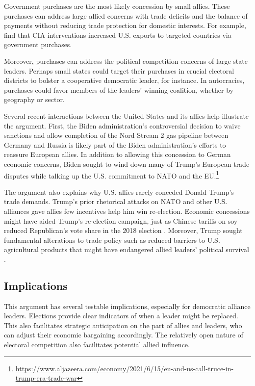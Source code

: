 \documentclass[12pt]{article}
\begin{document}
Government purchases are the most likely concession by small allies. 
These purchases can address large allied concerns with trade deficits and the balance of payments without reducing trade protection for domestic interests. 
For example, \citep{Bergeretal2013} find that CIA interventions increased U.S. exports to targeted countries via government purchases.


Moreover, purchases can address the political competition concerns of large state leaders.
Perhaps small states could target their purchases in crucial electoral districts to bolster a cooperative democratic leader, for instance. 
In autocracies, purchases could favor members of the leaders' winning coalition, whether by geography or sector.


Several recent interactions between the United States and its allies help illustrate the argument. 
First, the Biden administration's controversial decision to waive sanctions and allow completion of the Nord Stream 2 gas pipeline between Germany and Russia is likely part of the Biden administration's efforts to reassure European allies. 
In addition to allowing this concession to German economic concerns, Biden sought to wind down many of Trump's European trade disputes while talking up the U.S. commitment to NATO and the EU.\footnote{\url{https://www.aljazeera.com/economy/2021/6/15/eu-and-us-call-truce-in-trump-era-trade-war}}


The argument also explains why U.S. allies rarely conceded Donald Trump's trade demands. 
Trump's prior rhetorical attacks on NATO and other U.S. alliances gave allies few incentives help him win re-election. 
Economic concessions might have aided Trump's re-election campaign, just as Chinese tariffs on soy reduced Republican's vote share in the 2018 election \citep{ChyzhUrbatsch2021}. 
Moreover, Trump sought fundamental alterations to trade policy such as reduced barriers to U.S. agricultural products that might have endangered allied leaders' political survival \citep{HeeParkJensen2007}.


\subsection{Implications}


This argument has several testable implications, especially for democratic alliance leaders.
Elections provide clear indicators of when a leader might be replaced. 
This also facilitates strategic anticipation on the part of allies and leaders, who can adjust their economic bargaining accordingly. 
The relatively open nature of electoral competition also facilitates potential allied influence. 
\end{document}
